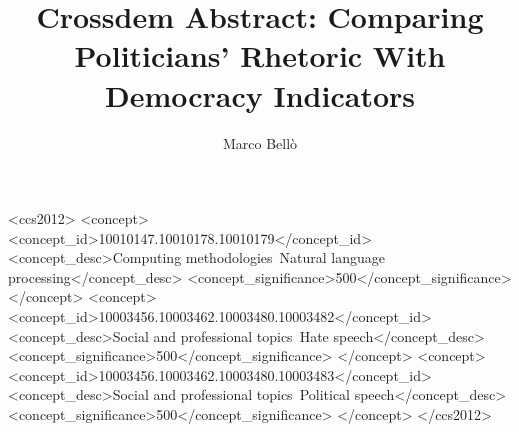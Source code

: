 \documentclass[manuscript,screen,review]{acmart}
\begin{document}
\title{Crossdem Abstract: Comparing Politicians' Rhetoric With Democracy Indicators}

\author{Marco Bellò}



\renewcommand{\shortauthors}{Bellò}

\begin{CCSXML}
<ccs2012>
   <concept>
       <concept_id>10010147.10010178.10010179</concept_id>
       <concept_desc>Computing methodologies~Natural language processing</concept_desc>
       <concept_significance>500</concept_significance>
       </concept>
   <concept>
       <concept_id>10003456.10003462.10003480.10003482</concept_id>
       <concept_desc>Social and professional topics~Hate speech</concept_desc>
       <concept_significance>500</concept_significance>
       </concept>
   <concept>
       <concept_id>10003456.10003462.10003480.10003483</concept_id>
       <concept_desc>Social and professional topics~Political speech</concept_desc>
       <concept_significance>500</concept_significance>
       </concept>
 </ccs2012>
\end{CCSXML}
\end{document}
